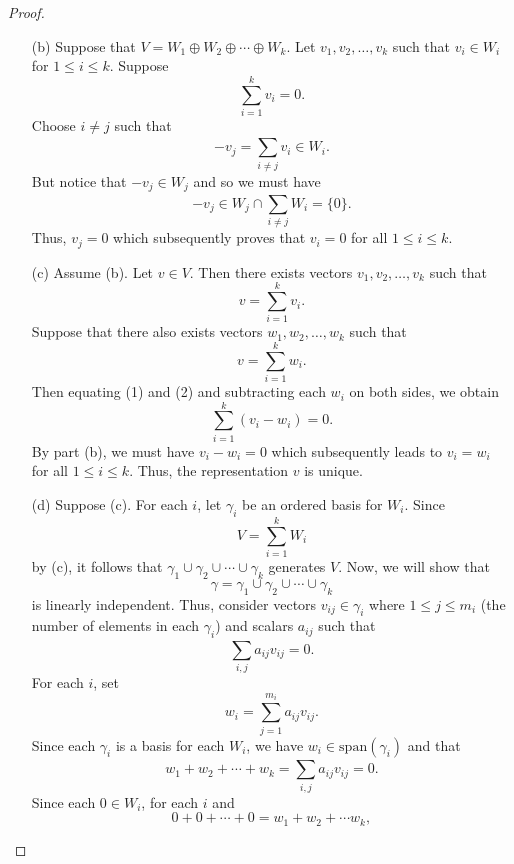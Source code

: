 \begin{proof}
\begin{enumerate}
    \item[(b)] Suppose that \( V = {W}_{1} \oplus {W}_{2} \oplus \cdots \oplus {W}_{k}   \). Let \( {v}_{1}, {v}_{2}, \dots, {v}_{k } \) such that \( {v}_{i} \in {W}_{i} \) for \( 1 \leq i \leq k  \). Suppose 
        \[  \sum_{ i=1  }^{ k  } {v}_{i} = 0. \]
         Choose \( i \neq j  \) such that 
        \[  -{v}_{j} = \sum_{ i \neq j }^{  } {v}_{i} \in {W}_{i}.  \]
        But notice that \( -{v}_{j} \in {W}_{j} \) and so we must have
        \[  {-v}_{j} \in {W}_{j} \cap \sum_{ i \neq j  }^{  }{W}_{i} = \{ 0  \}. \]
        Thus, \( {v}_{j} = 0  \) which subsequently proves that \( {v}_{i} = 0  \) for all \( 1 \leq i \leq k  \).
    \item[(c)] Assume (b). Let \( v \in V  \). Then there exists vectors \( {v}_{1}, {v}_{2}, \dots, {v}_{k} \) such that 
        \[  v = \sum_{ i=1  }^{ k  } {v}_{i}. \tag{1} \]
    Suppose that there also exists vectors \( {w}_{1}, {w}_{2}, \dots, {w}_{k } \) such that
    \[  v = \sum_{ i=1  }^{ k  } {w}_{i}. \tag{2} \]
    Then equating (1) and (2) and subtracting each \( {w}_{i}  \) on both sides, we obtain
    \[  \sum_{ i=1  }^{ k  } ({v}_{i} - {w}_{i}) = 0.   \]
    By part (b), we must have \( {v}_{i} - {w}_{i} = 0  \) which subsequently leads to \( {v}_{i} = {w}_{i} \) for all \( 1 \leq i \leq k  \). Thus, the representation \( v  \) is unique.
    \item[(d)] Suppose (c). For each \( i  \), let \( {\gamma}_{i} \) be an ordered basis for \( {W}_{i} \). Since  
        \[  V = \sum_{ i=1 }^{ k  }{W}_{i} \]
        by (c), it follows that \( {\gamma}_{1} \cup {\gamma}_{2} \cup \cdots \cup {\gamma}_{k} \) generates \( V  \). Now, we will show that
        \[  \gamma =  {\gamma}_{1} \cup {\gamma}_{2} \cup \cdots \cup {\gamma}_{k}  \]
        is linearly independent. Thus, consider vectors \( {v}_{ij} \in {\gamma}_{i} \) where \( 1 \leq j \leq {m}_{i} \) (the number of elements in each \( {\gamma}_{i} \)) and scalars \( {a}_{ij} \) such that
        \[  \sum_{ i,j }^{  } {a}_{ij} {v}_{ij} = 0. \]
        For each \( i  \), set
        \[  {w}_{i} = \sum_{ j=1 }^{ {m}_{i} } {a}_{ij} {v}_{ij}. \]
        Since each \( {\gamma}_{i}  \) is a basis for each \( {W}_{i}  \), we have \( {w}_{i} \in \text{span}({\gamma}_{i}) \) and that 
        \[  {w}_{1} + {w}_{2} + \cdots + {w}_{k} = \sum_{ i,j }^{  } {a}_{ij} {v}_{ij} = 0. \]
        Since each \( 0 \in {W}_{i} \), for each \( i  \) and 
        \[  0 + 0 + \cdots + 0 = {w}_{1} + {w}_{2} + \cdots {w}_{k}, \]

\end{enumerate}
\end{proof}
